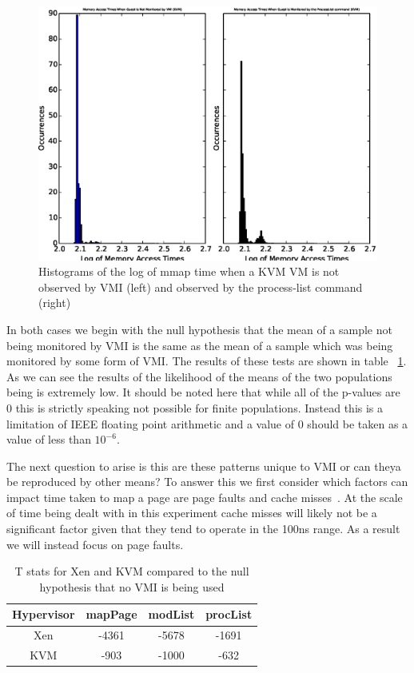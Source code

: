 	\begin{figure}[p!]\label{KVMMMapHist1}
	  \centering
	  \includegraphics[width=\textwidth]{figures/KVMMMApTestNoVMIvsProcList.eps}
	  \caption{Histograms of the log of mmap time when a KVM VM is not observed by VMI (left) and observed by the process-list command (right)}
	\end{figure}

In both cases we begin with the null hypothesis that the mean of a sample not being monitored by VMI is the same as the mean of a sample which was being monitored by some form of VMI. The results of these tests are shown in table ~\ref{TStatsMMap1}. 
As we can see the results of the likelihood of the means of the two populations being is extremely low. It should be noted here that while all of the p-values are 0 this is strictly speaking not possible for finite populations. Instead this is a limitation of IEEE floating point arithmetic and a value of 0 should be taken as a value of less than $10^{-6}$.

The next question to arise is this are these patterns unique to VMI or can theya be reproduced by other means? To answer this we first consider which factors can impact time taken to map a page are page faults and cache misses~\cite{bryant_computer_2003}.  At the scale of time being dealt with in this experiment cache misses will likely not be a significant factor given that they tend to operate in the 100ns range. As a result we will instead focus on page faults. 


	\begin{table}[p!]
		\centering
		\begin{tabular}{| c | c | c | c |}
			\hline
			Hypervisor & mapPage & modList & procList  \\ \hline
			Xen & -4361 & -5678 & -1691  \\  \hline
			KVM & -903 & -1000 & -632  \\ \hline
		\end{tabular}
		\label{TStatsMMap1}
		\caption{T stats for Xen and KVM compared to the null hypothesis that no VMI is being used}
	\end{table}

